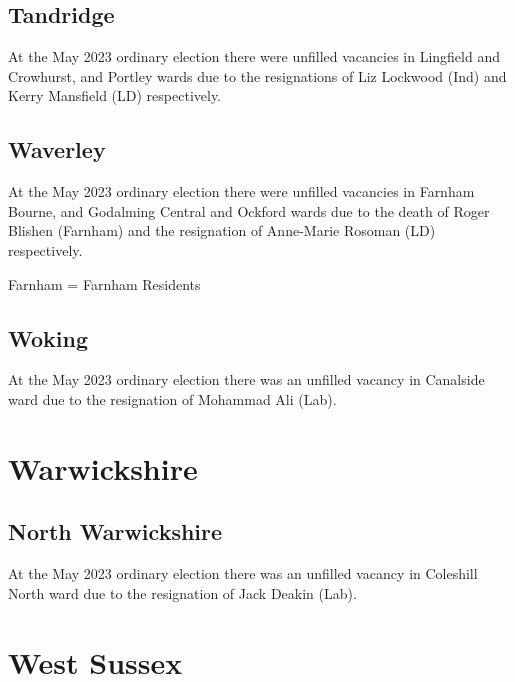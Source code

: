 \documentclass[a4paper,openany]{book}
\begin{document}
\begin{resultsiii}
\subsection*{Tandridge}

At the May 2023 ordinary election there were unfilled vacancies in Lingfield and Crowhurst, and Portley wards due to the resignations of Liz Lockwood (Ind) and Kerry Mansfield (LD) respectively.%
%

\subsection*{Waverley}

At the May 2023 ordinary election there were unfilled vacancies in Farnham Bourne, and Godalming Central and Ockford wards due to the death of Roger Blishen (Farnham) and the resignation of Anne-Marie Rosoman (LD) respectively.%
%

Farnham = Farnham Residents

\subsection*{Woking}

At the May 2023 ordinary election there was an unfilled vacancy in Canalside ward due to the resignation of Mohammad Ali (Lab).%

\section{Warwickshire}

\subsection*{North Warwickshire}

At the May 2023 ordinary election there was an unfilled vacancy in Coleshill North ward due to the resignation of Jack Deakin (Lab).%

\section{West Sussex}


\end{resultsiii}
\end{document}
